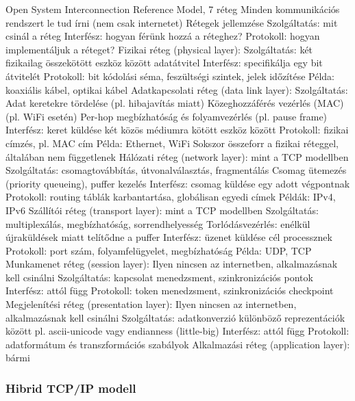 \documentclass[12pt,a4paper]{article}
\begin{document}
\begin{outline}
	\1 Open System Interconnection Reference Model, 7 réteg
	\1 Minden kommunikációs rendszert le tud írni (nem csak internetet)
	\1 Rétegek jellemzése
		\2 Szolgáltatás: mit csinál a réteg
		\2 Interfész: hogyan férünk hozzá a réteghez?
		\2 Protokoll: hogyan implementáljuk a réteget?
	\1 Fizikai réteg (physical layer):
		\2 Szolgáltatás: két fizikailag összekötött eszköz között adatátvitel
		\2 Interfész: specifikálja egy bit átvitelét
		\2 Protokoll: bit kódolási séma, feszültségi szintek, jelek időzítése
		\2 Példa: koaxiális kábel, optikai kábel
	\1 Adatkapcsolati réteg (data link layer):
		\2 Szolgáltatás:
			\3 Adat keretekre tördelése (pl. hibajavítás miatt)
			\3 Közeghozzáférés vezérlés (MAC) (pl. WiFi esetén)
			\3 Per-hop megbízhatóság és folyamvezérlés (pl. pause frame)
		\2 Interfész: keret küldése két közös médiumra kötött eszköz között
		\2 Protokoll: fizikai címzés, pl. MAC cím
		\2 Példa: Ethernet, WiFi
		\2 Sokszor összeforr a fizikai réteggel, általában nem függetlenek
	\1 Hálózati réteg (network layer): mint a TCP modellben
		\2 Szolgáltatás: csomagtovábbítás, útvonalválasztás, fragmentálás
			\3 Csomag ütemezés (priority queueing), puffer kezelés
		\2 Interfész: csomag küldése egy adott végpontnak
		\2 Protokoll: routing táblák karbantartása, globálisan egyedi címek
		\2 Példák: IPv4, IPv6
\pagebreak
	\1 Szállítói réteg (transport layer): mint a TCP modellben
		\2 Szolgáltatás: multiplexálás, megbízhatóság, sorrendhelyesség
			\3 Torlódásvezérlés: enélkül újraküldések miatt telítődne a puffer
		\2 Interfész: üzenet küldése cél processznek
		\2 Protokoll: port szám, folyamfelügyelet, megbízhatóság
		\2 Példa: UDP, TCP
	\1 Munkamenet réteg (session layer):
		\2 Ilyen nincsen az internetben, alkalmazásnak kell csinálni
		\2 Szolgáltatás: kapcsolat menedzsment, szinkronizációs pontok
		\2 Interfész: attól függ
		\2 Protokoll: token menedzsment, szinkronizációs checkpoint
	\1 Megjelenítési réteg (presentation layer):
		\2 Ilyen nincsen az internetben, alkalmazásnak kell csinálni
		\2 Szolgáltatás: adatkonverzió különböző reprezentációk között
			\2 pl. ascii-unicode vagy endianness (little-big)
		\2 Interfész: attól függ
		\2 Protokoll: adatformátum és transzformációs szabályok
	\1 Alkalmazási réteg (application layer): bármi
\end{outline}

\subsubsection{Hibrid TCP/IP modell}
\end{document}
